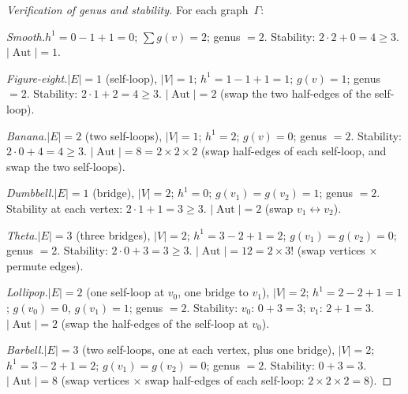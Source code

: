 \documentclass[11pt,reqno]{amsart}
\theoremstyle{definition}
\theoremstyle{remark}
\DeclareMathOperator{\Aut}{Aut}
\numberwithin{equation}{section}
\begin{document}
\begin{proof}[Verification of genus and stability]
For each graph~$\Gamma$:

\emph{Smooth.}\enspace $h^1 = 0 - 1 + 1 = 0$;
$\sum g(v) = 2$; genus $= 2$.
Stability: $2 \cdot 2 + 0 = 4 \ge 3$. $|\Aut| = 1$.

\emph{Figure-eight.}\enspace $|E| = 1$ (self-loop),
$|V| = 1$; $h^1 = 1 - 1 + 1 = 1$; $g(v) = 1$;
genus $= 2$. Stability: $2 \cdot 1 + 2 = 4 \ge 3$.
$|\Aut| = 2$ (swap the two half-edges of the self-loop).

\emph{Banana.}\enspace $|E| = 2$ (two self-loops),
$|V| = 1$; $h^1 = 2$; $g(v) = 0$; genus $= 2$.
Stability: $2 \cdot 0 + 4 = 4 \ge 3$.
$|\Aut| = 8 = 2 \times 2 \times 2$ (swap half-edges of
each self-loop, and swap the two self-loops).

\emph{Dumbbell.}\enspace $|E| = 1$ (bridge),
$|V| = 2$; $h^1 = 0$; $g(v_1) = g(v_2) = 1$;
genus $= 2$. Stability at each vertex:
$2 \cdot 1 + 1 = 3 \ge 3$. $|\Aut| = 2$
(swap $v_1 \leftrightarrow v_2$).

\emph{Theta.}\enspace $|E| = 3$ (three bridges),
$|V| = 2$; $h^1 = 3 - 2 + 1 = 2$;
$g(v_1) = g(v_2) = 0$; genus $= 2$.
Stability: $2 \cdot 0 + 3 = 3 \ge 3$.
$|\Aut| = 12 = 2 \times 3!$ (swap vertices $\times$
permute edges).

\emph{Lollipop.}\enspace $|E| = 2$ (one self-loop at
$v_0$, one bridge to $v_1$), $|V| = 2$;
$h^1 = 2 - 2 + 1 = 1$; $g(v_0) = 0$, $g(v_1) = 1$;
genus $= 2$. Stability: $v_0$: $0 + 3 = 3$;
$v_1$: $2 + 1 = 3$. $|\Aut| = 2$ (swap the half-edges
of the self-loop at $v_0$).

\emph{Barbell.}\enspace $|E| = 3$ (two self-loops, one
at each vertex, plus one bridge), $|V| = 2$;
$h^1 = 3 - 2 + 1 = 2$; $g(v_1) = g(v_2) = 0$;
genus $= 2$. Stability: $0 + 3 = 3$.
$|\Aut| = 8$ (swap vertices $\times$ swap half-edges
of each self-loop: $2 \times 2 \times 2 = 8$).
\end{proof}


\end{document}
